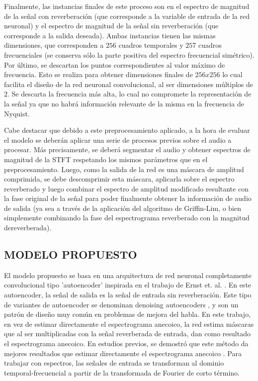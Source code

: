 Finalmente, las instancias finales de este proceso son en el espectro de magnitud de la señal con reverberación (que corresponde a la variable de entrada de la red neuronal) y el espectro de magnitud de la señal sin reverberación (que corresponde a la salida deseada). Ambas instancias tienen las mismas dimensiones, que corresponden a $256$ cuadros temporales y $257$ cuadros frecuenciales (se conserva sólo la parte positiva del espectro frecuencial simétrico). Por último, se descartan los puntos correspondientes al valor máximo de frecuencia. Esto se realiza para obtener dimensiones finales de $256x256$ lo cual facilita el diseño de la red neuronal convolucional, al ser dimensiones múltiplos de $2$. Se descarta la frecuencia más alta, lo cual no compromete la representación de la señal ya que no habrá información relevante de la misma en la frecuencia de Nyquist.

Cabe destacar que debido a este preprocesamiento aplicado, a la hora de evaluar el modelo se deberán aplicar una serie de procesos previos sobre el audio a procesar. Más precisamente, se deberá segmentar el audio y obtener espectros de magnitud de la STFT respetando los mismos parámetros que en el preprocesamiento. Luego, como la salida de la red es una máscara de amplitud comprimida, se debe descomprimir esta máscara, aplicarla sobre el espectro reverberado y luego combinar el espectro de amplitud modificado resultante con la fase original de la señal para poder finalmente obtener la información de audio de salida (ya sea a través de la aplicación del algoritmo de Griffin-Lim, o bien simplemente combinando la fase del espectrograma reverberado con la magnitud dereverberada).


\subsection[Modelo propuesto]{MODELO PROPUESTO}

El modelo propuesto se basa en una arquitectura de red neuronal completamente convolucional tipo 'autoencoder' inspirada en el trabajo de Ernst et. al. \cite{FCN}. En este autoencoder, la señal de salida es la señal de entrada sin reverberación. Este tipo de variantes de autoencoder se denominan denoising autoencoders \cite{DAE}, y son un patrón de diseño muy común en problemas de mejora del habla. En este trabajo, en vez de estimar directamente el espectrograma anecoico, la red estima máscaras que al ser multiplicadas con la señal reverberada de entrada, dan como resultado el espectrograma anecoico. En estudios previos, se demostró que este método da mejores resultados que estimar directamente el espectrograma anecoico \cite{mask_vs_map}. Para trabajar con espectros, las señales de entrada se transforman al dominio temporal-frecuencial a partir de la transformada de Fourier de corto término.
 
